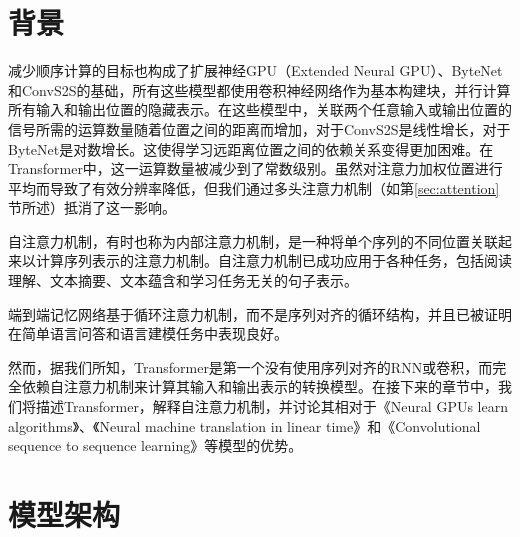 \documentclass[lang=cn,a4paper,newtx]{elegantpaper}
\begin{document}
\section{背景}

减少顺序计算的目标也构成了扩展神经GPU（Extended Neural GPU）、ByteNet和ConvS2S的基础，所有这些模型都使用卷积神经网络作为基本构建块，并行计算所有输入和输出位置的隐藏表示。在这些模型中，关联两个任意输入或输出位置的信号所需的运算数量随着位置之间的距离而增加，对于ConvS2S是线性增长，对于ByteNet是对数增长。这使得学习远距离位置之间的依赖关系变得更加困难。在Transformer中，这一运算数量被减少到了常数级别。虽然对注意力加权位置进行平均而导致了有效分辨率降低，但我们通过多头注意力机制（如第\ref{sec:attention}节所述）抵消了这一影响。

自注意力机制，有时也称为内部注意力机制，是一种将单个序列的不同位置关联起来以计算序列表示的注意力机制。自注意力机制已成功应用于各种任务，包括阅读理解、文本摘要、文本蕴含和学习任务无关的句子表示。

端到端记忆网络基于循环注意力机制，而不是序列对齐的循环结构，并且已被证明在简单语言问答和语言建模任务中表现良好。

然而，据我们所知，Transformer是第一个没有使用序列对齐的RNN或卷积，而完全依赖自注意力机制来计算其输入和输出表示的转换模型。在接下来的章节中，我们将描述Transformer，解释自注意力机制，并讨论其相对于《Neural GPUs learn algorithms》、《Neural machine translation in linear time》和《Convolutional sequence to sequence learning》等模型的优势。

\section{模型架构}
\end{document}
